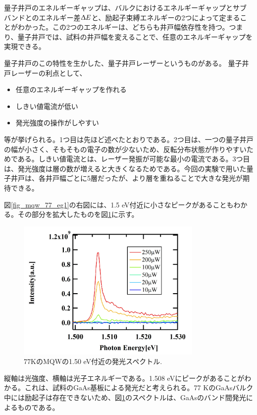 \documentclass[11pt,a4j]{jsarticle}
\begin{document}
\begin{enumerate}

       量子井戸のエネルギーギャップは、バルクにおけるエネルギーギャップとサブバンドとのエネルギー差$\Updelta E$と、励起子束縛エネルギーの2つによって定まることがわかった。この2つのエネルギーは、どちらも井戸幅依存性を持つ。つまり、量子井戸では、試料の井戸幅を変えることで、任意のエネルギーギャップを実現できる。

       量子井戸のこの特性を生かした、量子井戸レーザーというものがある。%
       量子井戸レーザーの利点として、
       \begin{itemize}
        \item 任意のエネルギーギャップを作れる
        \item しきい値電流が低い
        \item 発光強度の操作がしやすい
       \end{itemize}
       等が挙げられる。1つ目は先ほど述べたとおりである。2つ目は、一つの量子井戸の幅が小さく、そもそもの電子の数が少ないため、反転分布状態が作りやすいためである。しきい値電流とは、レーザー発振が可能な最小の電流である。3つ目は、発光強度は層の数が増えると大きくなるためである。今回の実験で用いた量子井戸は、各井戸幅ごとに5層だったが、より層を重ねることで大きな発光が期待できる。

       図\ref{fig_mqw_77_eg1}の右図には、1.5 eV付近に小さなピークがあることもわかる。その部分を拡大したものを図\ref{fig_mqw_77_1.5ev1}に示す。

       \begin{figure}[ht]
        \centering
        \includegraphics[clip,width=9cm]{start2_MQW_77K_GaAs.jpg}
        \caption{77KのMQWの1.50 eV付近の発光スペクトル.}
        \label{fig_mqw_77_1.5ev1}
       \end{figure}

       縦軸は光強度、横軸は光子エネルギーである。1.508 eVにピークがあることがわかる。これは、試料のGaAs基板による発光だと考えられる。77 KのGaAsバルク中には励起子は存在できないため、図\ref{fig_mqw_77_1.5ev1}のスペクトルは、GaAsのバンド間発光によるものである。

\end{enumerate}%
\end{document}
